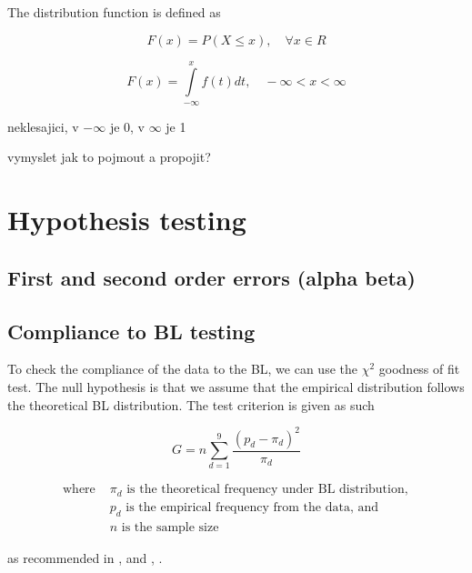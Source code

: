 The distribution function is defined as 

\begin{equation}
    F(x) = P(X \le x), \quad \forall x \in R
\end{equation}

\begin{equation}
    F(x) = \int\limits_{-\infty}^{x} f (t) dt, \quad -\infty <x<\infty
\end{equation}

\begin{koment}
    neklesajici, v $-\infty$ je 0, v $\infty$ je 1

    vymyslet jak to pojmout a propojit? 
\end{koment}

\cite{Marek2024}

\section{Hypothesis testing}

\subsection{First and second order errors (alpha beta)}

\subsection{Compliance to BL testing}
To check the compliance of the data to the BL, we can use the $\chi^2$ goodness of fit test. The null hypothesis is that we assume that the empirical distribution follows the theoretical BL distribution. The test criterion is given as such 

\begin{equation}
    \label{chi-sq-test}
    G= n \sum\limits_{d=1}^{9} \frac{(p_d -\pi_d)^2}{\pi_d} 
\end{equation}

\begin{align*}
    \text{where } &\pi_d \text{ is the theoretical frequency under BL distribution}, \\
    &p_d \text{ is the empirical frequency from the data, and} \\ 
    &n \text{ is the sample size}
\end{align*} 

as recommended in \citeauthor{Hronova2023}, \citeyear{Hronova2023} and  \citeauthor{kossovsky2014benford}, \citeyear{kossovsky2014benford}. %




